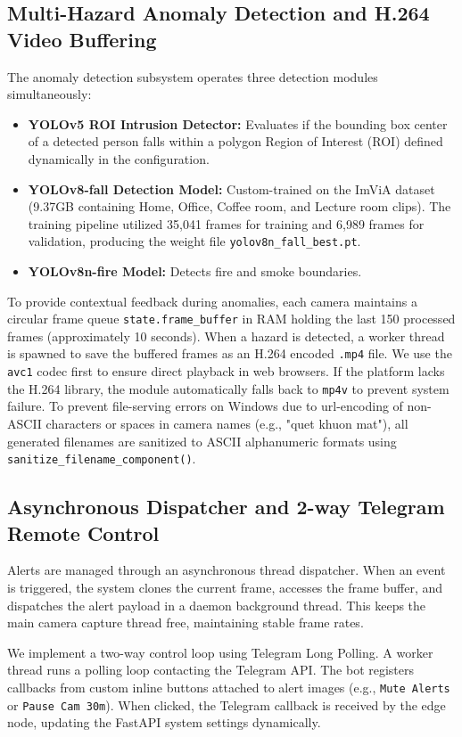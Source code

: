 \documentclass[12pt,a4paper]{article}
\begin{document}
\subsection{Multi-Hazard Anomaly Detection and H.264 Video Buffering}
The anomaly detection subsystem operates three detection modules simultaneously:
\begin{itemize}
    \item \textbf{YOLOv5 ROI Intrusion Detector:} Evaluates if the bounding box center of a detected person falls within a polygon Region of Interest (ROI) defined dynamically in the configuration.
    \item \textbf{YOLOv8-fall Detection Model:} Custom-trained on the ImViA dataset (9.37GB containing Home, Office, Coffee room, and Lecture room clips). The training pipeline utilized 35,041 frames for training and 6,989 frames for validation, producing the weight file \texttt{yolov8n\_fall\_best.pt}.
    \item \textbf{YOLOv8n-fire Model:} Detects fire and smoke boundaries.
\end{itemize}

To provide contextual feedback during anomalies, each camera maintains a circular frame queue \texttt{state.frame\_buffer} in RAM holding the last 150 processed frames (approximately 10 seconds). When a hazard is detected, a worker thread is spawned to save the buffered frames as an H.264 encoded \texttt{.mp4} file.
We use the \texttt{avc1} codec first to ensure direct playback in web browsers. If the platform lacks the H.264 library, the module automatically falls back to \texttt{mp4v} to prevent system failure.
To prevent file-serving errors on Windows due to url-encoding of non-ASCII characters or spaces in camera names (e.g., "quet khuon mat"), all generated filenames are sanitized to ASCII alphanumeric formats using \texttt{sanitize\_filename\_component()}.

\subsection{Asynchronous Dispatcher and 2-way Telegram Remote Control}
Alerts are managed through an asynchronous thread dispatcher. When an event is triggered, the system clones the current frame, accesses the frame buffer, and dispatches the alert payload in a daemon background thread. This keeps the main camera capture thread free, maintaining stable frame rates.

We implement a two-way control loop using Telegram Long Polling. A worker thread runs a polling loop contacting the Telegram API. The bot registers callbacks from custom inline buttons attached to alert images (e.g., \texttt{Mute Alerts} or \texttt{Pause Cam 30m}). When clicked, the Telegram callback is received by the edge node, updating the FastAPI system settings dynamically.
\end{document}
